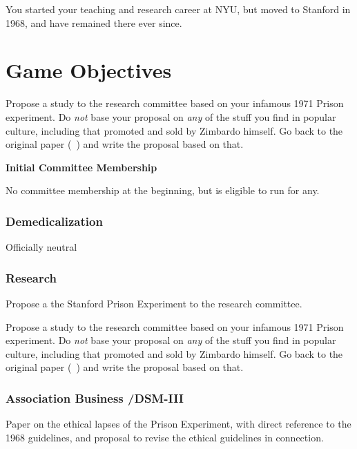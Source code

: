 \begin{refsection}
You started your teaching and research career at NYU, but moved to Stanford in 1968, and have remained there ever since.

\section{Game Objectives}
\label{gameobjectives}

Propose a study to the research committee based on your infamous 1971 Prison experiment. Do \emph{not} base your proposal on \emph{any} of the stuff you find in popular culture, including that promoted and sold by Zimbardo himself. Go back to the original paper (~\citep{Haney:1973wf}) and write the proposal based on that.

\textbf{Initial Committee Membership}

No committee membership at the beginning, but is eligible to run for any.

\subsubsection{Demedicalization}
\label{demedicalization}

Officially neutral

\subsubsection{Research}
\label{research}

\begin{researchtask}[Zimbardo]\label{researchtask:zimbardo}
Propose a the Stanford Prison Experiment to the research committee.
\end{researchtask}

Propose a study to the research committee based on your infamous 1971 Prison experiment. Do \emph{not} base your proposal on \emph{any} of the stuff you find in popular culture, including that promoted and sold by Zimbardo himself. Go back to the original paper (~\citep{Haney:1973wf}) and write the proposal based on that.

\subsubsection{Association Business \slash  DSM-III}
\label{associationbusinessdsm-iii}

\begin{writingtask}[Zimbardo]\label{writingtask:zimbardo}
Paper on the ethical lapses of the Prison Experiment, with direct reference to the 1968 guidelines, and proposal to revise the ethical guidelines in connection.
\end{writingtask}


\end{refsection}
